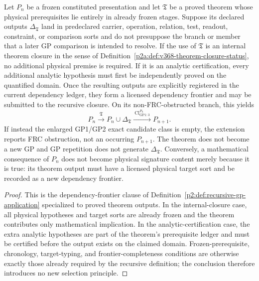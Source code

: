 \documentclass[12pt,a4paper]{article}
\begin{document}
\begin{corollary}
\label{p2a:cor:v176-licensed-theorem-generated-frontier}
Let \(P_n\) be a frozen constituted presentation and let \(\mathfrak T\) be
a proved theorem whose physical prerequisites lie entirely in already frozen
stages.  Suppose its declared outputs \(\Delta_{\mathfrak T}\) land in
predeclared carrier, operation, relation, test, readout, constraint, or
comparison sorts and do not presuppose the branch or member that a later GP
comparison is intended to resolve.  If the use of \(\mathfrak T\) is an
internal theorem closure in the sense of
Definition~\ref{p2a:def:v368-theorem-closure-status}, no additional physical
premise is required.  If it is an analytic certification, every additional
analytic hypothesis must first be independently proved on the quantified
domain.  Once the resulting outputs are explicitly registered in the current
dependency ledger, they form a licensed dependency frontier and may be
submitted to the recursive closure.  On its non-FRC-obstructed branch,
this yields
\[
 P_n\xrightarrow{\ \mathfrak T\ }
 P_n\cup\Delta_{\mathfrak T}
 \xrightarrow{\ \operatorname{Cl}^{P_n}_{\mathrm{GP1:3}}\ }
 P_{n+1}.
\]
If instead the enlarged GP1/GP2 exact candidate class is empty,
the extension reports FRC obstruction, not an occurring \(P_{n+1}\).
The theorem does not become a new GP and GP repetition does not generate
\(\Delta_{\mathfrak T}\).  Conversely, a mathematical consequence of
\(P_n\) does not become physical signature content merely because it is true:
its theorem output must have a licensed physical target sort and be recorded
as a new dependency frontier.
\end{corollary}

\begin{proof}
This is the dependency-frontier clause of
Definition~\ref{p2:def:recursive-gp-application} specialized to proved theorem
outputs.  In the internal-closure case, all physical hypotheses and target
sorts are already frozen and the theorem contributes only mathematical
implication.  In the analytic-certification case, the extra analytic
hypotheses are part of the theorem's prerequisite ledger and must be certified
before the output exists on the claimed domain.  Frozen-prerequisite,
chronology, target-typing, and frontier-completeness conditions are otherwise
exactly those already required by the recursive definition; the conclusion
therefore introduces no new selection principle.
\end{proof}
\end{document}
